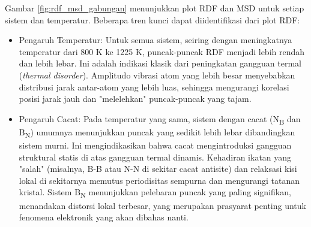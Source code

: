 Gambar \ref{fig:rdf_msd_gabungan} menunjukkan plot RDF dan MSD untuk setiap sistem dan temperatur.
Beberapa tren kunci dapat diidentifikasi dari plot RDF:
\begin{itemize}
    \item Pengaruh Temperatur: Untuk semua sistem, seiring dengan meningkatnya temperatur dari 800 K ke 1225 K, puncak-puncak RDF menjadi lebih rendah dan lebih lebar.
Ini adalah indikasi klasik dari peningkatan gangguan termal (\emph{thermal disorder}).
Amplitudo vibrasi atom yang lebih besar menyebabkan distribusi jarak antar-atom yang lebih luas, sehingga mengurangi korelasi posisi jarak jauh dan "melelehkan" puncak-puncak yang tajam.
\item Pengaruh Cacat: Pada temperatur yang sama, sistem dengan cacat (N\textsubscript{B} dan B\textsubscript{N}) umumnya menunjukkan puncak yang sedikit lebih lebar dibandingkan sistem murni.
Ini mengindikasikan bahwa cacat mengintroduksi gangguan struktural statis di atas gangguan termal dinamis.
Kehadiran ikatan yang "salah" (misalnya, B-B atau N-N di sekitar cacat antisite) dan relaksasi kisi lokal di sekitarnya memutus periodisitas sempurna dan mengurangi tatanan kristal.
Sistem B\textsubscript{N} menunjukkan pelebaran puncak yang paling signifikan, menandakan distorsi lokal terbesar, yang merupakan prasyarat penting untuk fenomena elektronik yang akan dibahas nanti.
\end{itemize}

